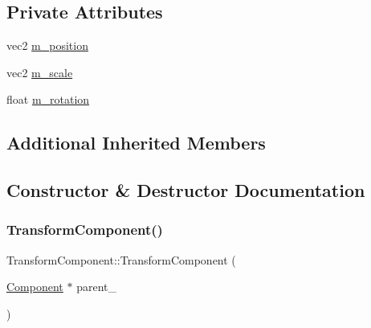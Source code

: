 \subsection*{Private Attributes}
\begin{DoxyCompactItemize}
\item 
vec2 \hyperlink{classTransformComponent_ac8a1a8fcebbb7fa0fe3be2cf7533d0fd}{m\+\_\+position}
\item 
vec2 \hyperlink{classTransformComponent_a206ad4f98e73d416584d6431a36b3c77}{m\+\_\+scale}
\item 
float \hyperlink{classTransformComponent_ae34e99299bb74a9e8674eab1a898095f}{m\+\_\+rotation}
\end{DoxyCompactItemize}
\subsection*{Additional Inherited Members}


\subsection{Constructor \& Destructor Documentation}
\mbox{\label{classTransformComponent_af26bd158601191fcf60666a75a0bf5db}} 
\subsubsection{\texorpdfstring{Transform\+Component()}{TransformComponent()}\hspace{0.1cm}{\footnotesize\ttfamily [1/2]}}
{\footnotesize\ttfamily Transform\+Component\+::\+Transform\+Component (\begin{DoxyParamCaption}\item[{\hyperlink{classComponent}{Component} $\ast$}]{parent\+\_\+ }\end{DoxyParamCaption})}

\mbox{\label{classTransformComponent_a6b5961168cb0bd9a044a106820f1c045}} 
